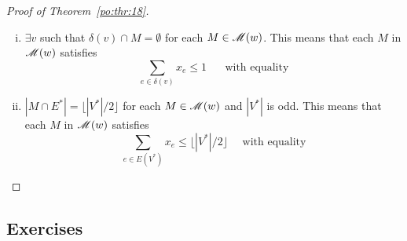 \begin{proof}[Proof of Theorem~\ref{po:thr:18}]
      \begin{enumerate}[i)]
      \item $\exists v$ such that $\delta(v) \cap M = \emptyset$ for each $M \in
        \mathscr{M}(w)$. This means that each $M$ in $\mathscr{M}(w)$ satisfies
        \begin{displaymath}
          \sum_{e \in          \delta(v)} x_e\leq1 \quad \text{ {with equality}}
         \end{displaymath}
      \item $|M\cap E^*| =   \lfloor|V^*| /2\rfloor$ for each $M \in \mathscr{M}(w)$ and $|V^*|$
        is odd. This means that each $M$ in $\mathscr{M}(w)$ satisfies
        \begin{displaymath}
           \sum_{e \in E(V^*)          } x_e\leq \lfloor|V^*|/2\rfloor \quad \text{
             {with equality}} 
        \end{displaymath}
      \end{enumerate}

    \end{proof}


\subsection*{Exercises}

